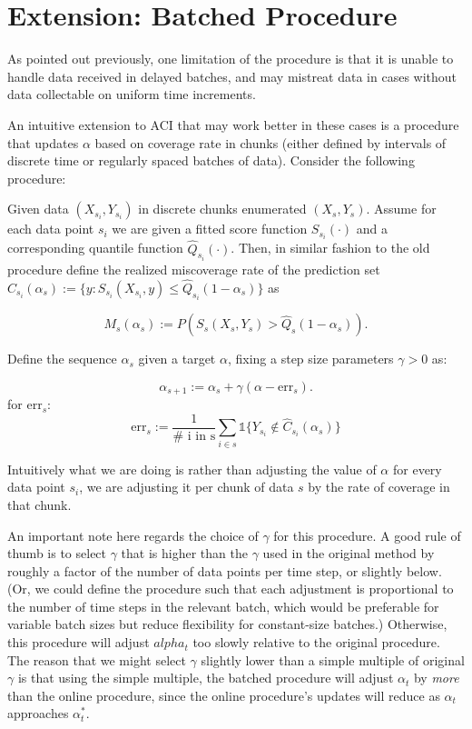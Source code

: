 \documentclass[
]{article}
\begin{document}
\hypertarget{extension-batched-procedure}{%
\section{Extension: Batched
Procedure}\label{extension-batched-procedure}}

As pointed out previously, one limitation of the procedure is that it is
unable to handle data received in delayed batches, and may mistreat data
in cases without data collectable on uniform time increments.

An intuitive extension to ACI that may work better in these cases is a
procedure that updates \(\alpha\) based on coverage rate in chunks
(either defined by intervals of discrete time or regularly spaced
batches of data). Consider the following procedure:

Given data \((X_{s_i}, Y_{s_i})\) in discrete chunks enumerated
\((X_s, Y_s)\). Assume for each data point \(s_i\) we are given a fitted
score function \(S_{s_i}(\cdot)\) and a corresponding quantile function
\(\hat{Q}_{s_i}(\cdot)\). Then, in similar fashion to the old procedure
define the realized miscoverage rate of the prediction set
\(\hat{C}_{s_i}(\alpha_s) := \{ y : S_{s_i}(X_{s_i}, y) \le \hat{Q}_{s_i}(1-\alpha_s) \}\)
as

\[ M_s(\alpha_s) := P(S_s(X_s, Y_s) > \hat{Q}_s(1-\alpha_s)). \]

Define the sequence \(\alpha_s\) given a target \(\alpha\), fixing a
step size parameters \(\gamma > 0\) as:

\[ \alpha_{s+1} := \alpha_s + \gamma(\alpha - \textrm{err}_s). \] for
\(\textrm{err}_s\):
\[ \textrm{err}_s := \frac{1}{\textrm{# i in s}}\sum_{i \in s}
\mathbb{1} \{ Y_{s_i} \notin \hat{C}_{s_i}(\alpha_s)\}
\]

Intuitively what we are doing is rather than adjusting the value of
\(\alpha\) for every data point \(s_i\), we are adjusting it per chunk
of data \(s\) by the rate of coverage in that chunk.

An important note here regards the choice of \(\gamma\) for this
procedure. A good rule of thumb is to select \(\gamma\) that is higher
than the \(\gamma\) used in the original method by roughly a factor of
the number of data points per time step, or slightly below. (Or, we
could define the procedure such that each adjustment is proportional to
the number of time steps in the relevant batch, which would be
preferable for variable batch sizes but reduce flexibility for
constant-size batches.) Otherwise, this procedure will adjust
\(alpha_t\) too slowly relative to the original procedure. The reason
that we might select \(\gamma\) slightly lower than a simple multiple of
original \(\gamma\) is that using the simple multiple, the batched
procedure will adjust \(\alpha_t\) by \emph{more} than the online
procedure, since the online procedure's updates will reduce as
\(\alpha_t\) approaches \(\alpha_t^*\).
\end{document}
